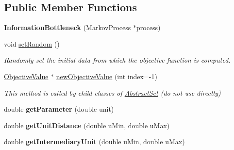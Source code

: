 \subsection*{Public Member Functions}
\begin{DoxyCompactItemize}
\item 
\hypertarget{classInformationBottleneck_aa2b0adc85665a04330d1356bf77097b6}{{\bfseries Information\-Bottleneck} (Markov\-Process $\ast$process)}\label{classInformationBottleneck_aa2b0adc85665a04330d1356bf77097b6}

\item 
\hypertarget{classInformationBottleneck_a10e4ace575f79977f3f6d2f39403dd84}{void \hyperlink{classInformationBottleneck_a10e4ace575f79977f3f6d2f39403dd84}{set\-Random} ()}\label{classInformationBottleneck_a10e4ace575f79977f3f6d2f39403dd84}

\begin{DoxyCompactList}\small\item\em Randomly set the initial data from which the objective function is computed. \end{DoxyCompactList}\item 
\hypertarget{classInformationBottleneck_af710cb93d1be643a5f67c5d879669b8b}{\hyperlink{classObjectiveValue}{Objective\-Value} $\ast$ \hyperlink{classInformationBottleneck_af710cb93d1be643a5f67c5d879669b8b}{new\-Objective\-Value} (int index=-\/1)}\label{classInformationBottleneck_af710cb93d1be643a5f67c5d879669b8b}

\begin{DoxyCompactList}\small\item\em This method is called by child classes of \hyperlink{classAbstractSet}{Abstract\-Set} (do not use directly) \end{DoxyCompactList}\item 
\hypertarget{classInformationBottleneck_ab3ccf81c8633628cd1a4cc37de61a95b}{double {\bfseries get\-Parameter} (double unit)}\label{classInformationBottleneck_ab3ccf81c8633628cd1a4cc37de61a95b}

\item 
\hypertarget{classInformationBottleneck_a2b29527ef1700808f67ceb1b821a1626}{double {\bfseries get\-Unit\-Distance} (double u\-Min, double u\-Max)}\label{classInformationBottleneck_a2b29527ef1700808f67ceb1b821a1626}

\item 
\hypertarget{classInformationBottleneck_a8a7cc07d65482418e1d62b5f84ec2c45}{double {\bfseries get\-Intermediary\-Unit} (double u\-Min, double u\-Max)}\label{classInformationBottleneck_a8a7cc07d65482418e1d62b5f84ec2c45}

\end{DoxyCompactItemize}
